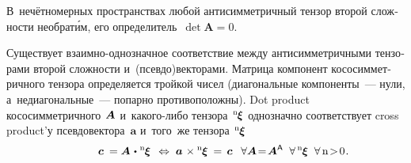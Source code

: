 \begin{otherlanguage}{russian}
В~нечётномерных пространствах любой антисимметричный тензор второй сложности необрат\'{и}м, его определитель~${\operatorname{det} \bm{A} = 0}$.

Существует взаимно\hbox{-}однозначное соответствие между антисимметричными тензорами второй сложности и~(псевдо)векторами. Матрица компонент кососимметричного тензора определяется тройкой чисел (диагональные компоненты~--- нули, а~недиагональные~--- попарно противоположны). Dot product кососимметричного~${\hspace{-0.2ex}\bm{A}}$ и~какого\hbox{-}либо тензора~${\hspace{-0.2ex}{^\mathrm{n}\hspace{-0.12ex}\bm{\xi}}}$ однозначно соответствует cross product’у псевдовектора~$\bm{a}$ и~того~же тензора~${\hspace{-0.2ex}{^\mathrm{n}\hspace{-0.12ex}\bm{\xi}}}$
\nopagebreak\vspace{.2em}\begin{equation}
\hspace{3.2em} \bm{c} \:= \bm{A} \hspace{0.2ex}\dotp\hspace{0.1ex} {^\mathrm{n}\hspace{-0.12ex}\bm{\xi}} \;\,\Leftrightarrow\; \bm{a} \hspace{0.2ex}\times {^\mathrm{n}\hspace{-0.12ex}\bm{\xi}} \:=\, \bm{c} \hspace{0.1ex} \;\:\:
\forall \bm{A} \!=\! \bm{A}^{\mathsf{\!\,A}} \;\; \forall \, {^\mathrm{n}\hspace{-0.12ex}\bm{\xi}} \;\; \forall \,\mathrm{n \!>\! 0} \hspace{0.16ex}.
\end{equation}


\end{otherlanguage}

